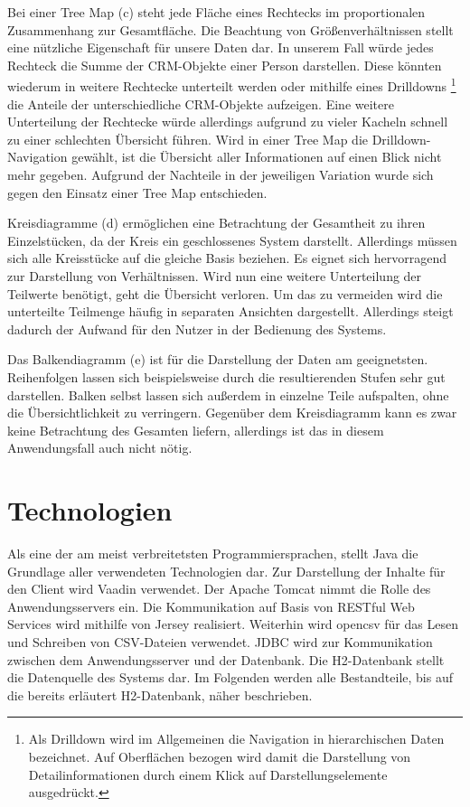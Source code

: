 Bei einer Tree Map (c) steht jede Fläche eines Rechtecks im proportionalen Zusammenhang zur Gesamtfläche. Die Beachtung von Größenverhältnissen stellt eine nützliche Eigenschaft für unsere Daten dar. In unserem Fall würde jedes Rechteck die Summe der CRM-Objekte einer Person darstellen. Diese könnten wiederum in weitere Rechtecke unterteilt werden oder mithilfe eines Drilldowns
\footnote{Als Drilldown wird im Allgemeinen die Navigation in hierarchischen Daten bezeichnet. Auf Oberflächen bezogen wird damit die Darstellung von Detailinformationen durch einem Klick auf Darstellungselemente ausgedrückt.}
 die Anteile der unterschiedliche CRM-Objekte aufzeigen. Eine weitere Unterteilung der Rechtecke würde allerdings aufgrund zu vieler Kacheln schnell zu einer schlechten Übersicht führen. Wird in einer Tree Map die Drilldown-Navigation gewählt, ist die Übersicht aller Informationen auf einen Blick nicht mehr gegeben. Aufgrund der Nachteile in der jeweiligen Variation wurde sich gegen den Einsatz einer Tree Map entschieden.

Kreisdiagramme (d) ermöglichen eine Betrachtung der Gesamtheit zu ihren Einzelstücken, da der Kreis ein geschlossenes System darstellt. Allerdings müssen sich alle Kreisstücke auf die gleiche Basis beziehen. Es eignet sich hervorragend zur Darstellung von Verhältnissen. Wird nun eine weitere Unterteilung der Teilwerte benötigt, geht die Übersicht verloren. Um das zu vermeiden wird die unterteilte Teilmenge häufig in separaten Ansichten dargestellt. Allerdings steigt dadurch der Aufwand für den Nutzer in der Bedienung des Systems. 

Das Balkendiagramm (e) ist für die Darstellung der Daten am geeignetsten. Reihenfolgen lassen sich beispielsweise durch die resultierenden Stufen sehr gut darstellen. Balken selbst lassen sich außerdem in einzelne Teile aufspalten, ohne die Übersichtlichkeit zu verringern. Gegenüber dem Kreisdiagramm kann es zwar keine Betrachtung des Gesamten liefern, allerdings ist das in diesem Anwendungsfall auch nicht nötig. 

\section{Technologien}

Als eine der am meist verbreitetsten Programmiersprachen, stellt Java die Grundlage aller verwendeten Technologien dar. Zur Darstellung der Inhalte für den Client wird Vaadin verwendet. Der Apache Tomcat nimmt die Rolle des Anwendungsservers ein. Die Kommunikation auf Basis von RESTful Web Services wird mithilfe von Jersey realisiert. Weiterhin wird opencsv für das Lesen und Schreiben von CSV-Dateien verwendet. JDBC wird zur Kommunikation zwischen dem Anwendungsserver und der Datenbank. Die H2-Datenbank stellt die Datenquelle des Systems dar. Im Folgenden werden alle Bestandteile, bis auf die bereits erläutert H2-Datenbank, näher beschrieben. 

